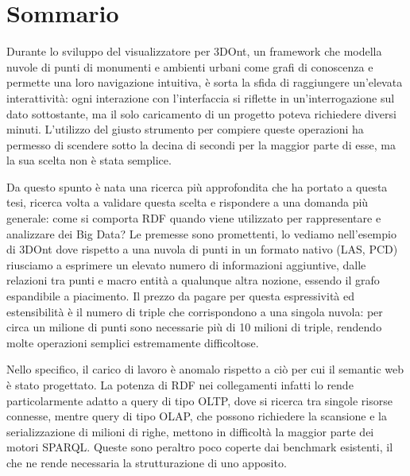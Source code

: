 \chapter*{Sommario}
\label{cha:sommario}

Durante lo sviluppo del visualizzatore per 3DOnt, un framework che modella nuvole di punti di monumenti
e ambienti urbani come grafi di conoscenza e permette una loro navigazione intuitiva, è sorta la sfida
di raggiungere un'elevata interattività: ogni interazione con l'interfaccia si riflette in un'interrogazione
sul dato sottostante, ma il solo caricamento di un progetto poteva richiedere diversi minuti. 
L'utilizzo del giusto strumento per compiere queste operazioni ha permesso di scendere sotto la decina di secondi
per la maggior parte di esse, ma la sua scelta non è stata semplice.

\par Da questo spunto è nata una ricerca più approfondita che ha portato a questa tesi, ricerca volta a validare
questa scelta e rispondere a una domanda più generale: come si comporta RDF quando viene utilizzato per
rappresentare e analizzare dei Big Data? 
Le premesse sono promettenti, lo vediamo nell'esempio di 3DOnt dove
rispetto a una nuvola di punti in un formato nativo (LAS, PCD) riusciamo a esprimere un elevato numero di informazioni
aggiuntive, dalle relazioni tra punti e macro entità a qualunque altra nozione, essendo il grafo espandibile a piacimento.
Il prezzo da pagare per questa espressività ed estensibilità è il numero di triple che corrispondono a una singola nuvola: per circa 
un milione di punti sono necessarie più di 10 milioni di triple, rendendo molte operazioni semplici estremamente difficoltose.

\par Nello specifico, il carico di lavoro è anomalo rispetto a ciò per cui il semantic web
è stato progettato. La potenza di RDF nei collegamenti infatti lo rende particolarmente adatto
a query di tipo OLTP, dove si ricerca tra singole risorse connesse, mentre query di tipo OLAP,
che possono richiedere la scansione e la serializzazione di milioni di righe, 
mettono in difficoltà la maggior parte dei motori SPARQL.
Queste sono peraltro poco coperte dai benchmark esistenti, il che ne rende necessaria la strutturazione
di uno apposito.

